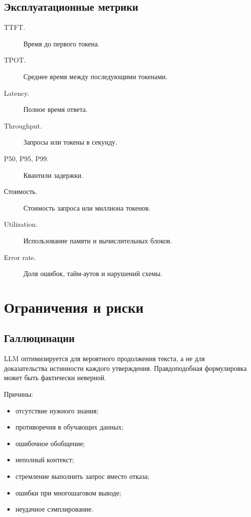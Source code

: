 \documentclass[12pt,a4paper]{article}
\newcommand{\1}{\mathbf{1}}
\theoremstyle{definition}
\theoremstyle{remark}
\begin{document}
\subsection{Эксплуатационные метрики}

\begin{description}
    \item[TTFT.] Время до первого токена.
    \item[TPOT.] Среднее время между последующими токенами.
    \item[Latency.] Полное время ответа.
    \item[Throughput.] Запросы или токены в секунду.
    \item[P50, P95, P99.] Квантили задержки.
    \item[Стоимость.] Стоимость запроса или миллиона токенов.
    \item[Utilization.] Использование памяти и вычислительных блоков.
    \item[Error rate.] Доля ошибок, тайм-аутов и нарушений схемы.
\end{description}

\section{Ограничения и риски}

\subsection{Галлюцинации}

LLM оптимизируется для вероятного продолжения текста, а не для
доказательства истинности каждого утверждения. Правдоподобная
формулировка может быть фактически неверной.

Причины:

\begin{itemize}
    \item отсутствие нужного знания;
    \item противоречия в обучающих данных;
    \item ошибочное обобщение;
    \item неполный контекст;
    \item стремление выполнить запрос вместо отказа;
    \item ошибки при многошаговом выводе;
    \item неудачное сэмплирование.
\end{itemize}
\end{document}
